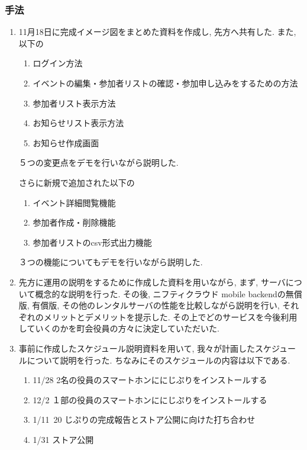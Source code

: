 \subsubsection{手法}
\begin{enumerate}
    \item 11月18日に完成イメージ図をまとめた資料を作成し, 先方へ共有した. また, 以下の
    \begin{enumerate}
        \item ログイン方法
        \item イベントの編集・参加者リストの確認・参加申し込みをするための方法
        \item 参加者リスト表示方法
        \item お知らせリスト表示方法
        \item お知らせ作成画面
    \end{enumerate}
    ５つの変更点をデモを行いながら説明した.

    さらに新規で追加された以下の
    \begin{enumerate}
        \item イベント詳細閲覧機能
        \item 参加者作成・削除機能
        \item 参加者リストのcsv形式出力機能
    \end{enumerate}
    ３つの機能についてもデモを行いながら説明した.

    \item 先方に運用の説明をするために作成した資料を用いながら, まず, サーバについて概念的な説明を行った.
    その後, ニフティクラウド mobile backendの無償版, 有償版, その他のレンタルサーバの性能を比較しながら説明を行い, それぞれのメリットとデメリットを提示した.
    その上でどのサービスを今後利用していくのかを町会役員の方々に決定していただいた.

    \item 事前に作成したスケジュール説明資料を用いて, 我々が計画したスケジュールについて説明を行った. ちなみにそのスケジュールの内容は以下である.
    \begin{enumerate}
        \item 11/28 2名の役員のスマートホンににじぷりをインストールする
        \item 12/2 １部の役員のスマートホンににじぷりをインストールする
        \item 1/11~20 じぷりの完成報告とストア公開に向けた打ち合わせ
        \item 1/31 ストア公開
    \end{enumerate}
\end{enumerate}

